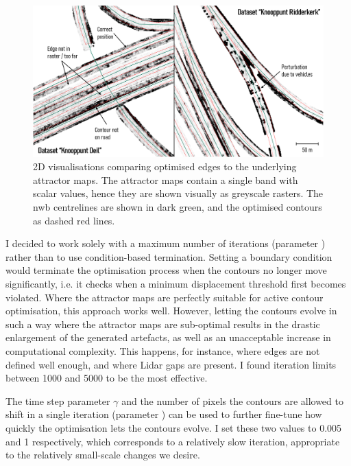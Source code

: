 \begin{figure}
    \centering
    \includegraphics[width=\linewidth]{final_report/figs/activecontouroptimisation1.png}
    \caption[Visualisations comparing optimised edges to attractor maps]{2D visualisations comparing optimised edges to the underlying attractor maps. The attractor maps contain a single band with scalar values, hence they are shown visually as greyscale rasters. The \ac{nwb} centrelines are shown in dark green, and the optimised contours as dashed red lines.}
    \label{fig:activecontouroptimisation1}
\end{figure}

I decided to work solely with a maximum number of iterations (parameter ) rather than to use condition-based termination. Setting a boundary condition would terminate the optimisation process when the contours no longer move significantly, i.e. it checks when a minimum displacement threshold first becomes violated. Where the attractor maps are perfectly suitable for active contour optimisation, this approach works well. However, letting the contours evolve in such a way where the attractor maps are sub-optimal results in the drastic enlargement of the generated artefacts, as well as an unacceptable increase in computational complexity. This happens, for instance, where edges are not defined well enough, and where Lidar gaps are present. I found iteration limits between 1000 and 5000 to be the most effective.

The time step parameter $\gamma$ and the number of pixels the contours are allowed to shift in a single iteration (parameter ) can be used to further fine-tune how quickly the optimisation lets the contours evolve. I set these two values to 0.005 and 1 respectively, which corresponds to a relatively slow iteration, appropriate to the relatively small-scale changes we desire.

